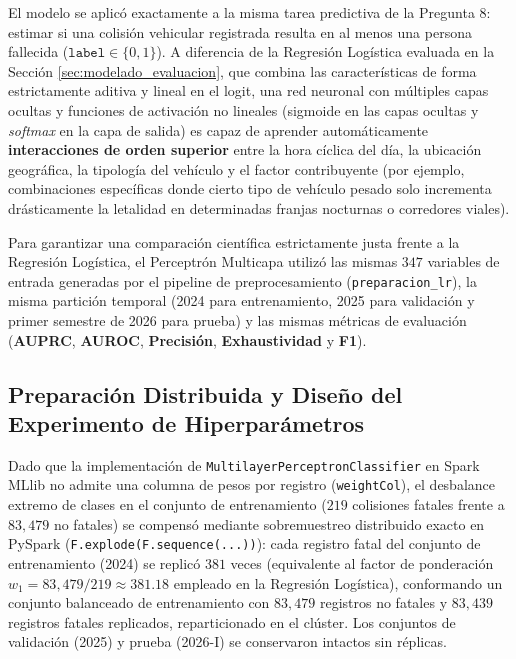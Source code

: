 \documentclass[11pt,a4paper]{article}
\begin{document}
El modelo se aplicó exactamente a la misma tarea predictiva de la Pregunta 8: estimar si una colisión vehicular registrada resulta en al menos una persona fallecida ($\texttt{label} \in \{0, 1\}$). A diferencia de la Regresión Logística evaluada en la Sección \ref{sec:modelado_evaluacion}, que combina las características de forma estrictamente aditiva y lineal en el logit, una red neuronal con múltiples capas ocultas y funciones de activación no lineales (sigmoide en las capas ocultas y \textit{softmax} en la capa de salida) es capaz de aprender automáticamente \textbf{interacciones de orden superior} entre la hora cíclica del día, la ubicación geográfica, la tipología del vehículo y el factor contribuyente (por ejemplo, combinaciones específicas donde cierto tipo de vehículo pesado solo incrementa drásticamente la letalidad en determinadas franjas nocturnas o corredores viales).

Para garantizar una comparación científica estrictamente justa frente a la Regresión Logística, el Perceptrón Multicapa utilizó las mismas $347$ variables de entrada generadas por el pipeline de preprocesamiento (\texttt{preparacion\_lr}), la misma partición temporal (2024 para entrenamiento, 2025 para validación y primer semestre de 2026 para prueba) y las mismas métricas de evaluación (\textbf{AUPRC}, \textbf{AUROC}, \textbf{Precisión}, \textbf{Exhaustividad} y \textbf{F1}).

\subsection{Preparación Distribuida y Diseño del Experimento de Hiperparámetros}
\label{subsec:bono_dl_experimento}

Dado que la implementación de \texttt{MultilayerPerceptronClassifier} en Spark MLlib no admite una columna de pesos por registro (\texttt{weightCol}), el desbalance extremo de clases en el conjunto de entrenamiento ($219$ colisiones fatales frente a $83,479$ no fatales) se compensó mediante sobremuestreo distribuido exacto en PySpark (\texttt{F.explode(F.sequence(...))}): cada registro fatal del conjunto de entrenamiento (2024) se replicó $381$ veces (equivalente al factor de ponderación $w_1 = 83{,}479 / 219 \approx 381.18$ empleado en la Regresión Logística), conformando un conjunto balanceado de entrenamiento con $83,479$ registros no fatales y $83,439$ registros fatales replicados, reparticionado en el clúster. Los conjuntos de validación (2025) y prueba (2026-I) se conservaron intactos sin réplicas.
\end{document}
